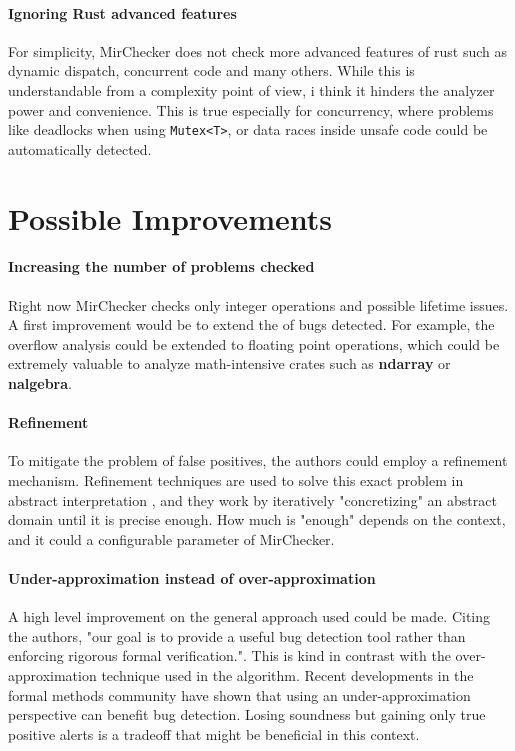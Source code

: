\documentclass{article}
\begin{document}
\paragraph{Ignoring Rust advanced features}
For simplicity, MirChecker does not check more advanced features of rust such as dynamic dispatch, concurrent code and many others. While 
this is understandable from a complexity point of view, i think it hinders the analyzer power and convenience. This is true especially for concurrency, 
where problems like deadlocks when using \texttt{Mutex<T>}, or data races inside unsafe code could be automatically detected.

\section{Possible Improvements}

\paragraph{Increasing the number of problems checked}
Right now MirChecker checks only integer operations and possible lifetime issues. 
A first improvement would be to extend the  of bugs detected. For example, the overflow 
analysis could be extended to floating point operations, which could be extremely valuable 
to analyze math-intensive crates such as \textbf{ndarray} or \textbf{nalgebra}.

\paragraph{Refinement}
To mitigate the problem of false positives, the authors could employ a refinement mechanism. Refinement techniques are used to solve 
this exact problem in abstract interpretation \cite{gulavani2006counterexample}\cite{bogomolov2017counterexample}, and they work by iteratively "concretizing" an abstract domain  until it is precise enough. 
How much is "enough" depends on the context, and it could a configurable parameter of MirChecker.
\paragraph{Under-approximation instead of over-approximation}
A high level improvement  on the general approach used could be made. Citing the authors, "our goal is to provide a useful bug detection tool rather
than enforcing rigorous formal verification.". This is kind in contrast with the over-approximation technique used in the algorithm. Recent developments 
in the formal methods community \cite{o2019incorrectness}\cite{murray2021incremental}\cite{le2022finding} have shown that using an under-approximation perspective can benefit bug detection. Losing soundness but gaining only true positive  alerts 
is a tradeoff that might be beneficial in this context.


\end{document}

